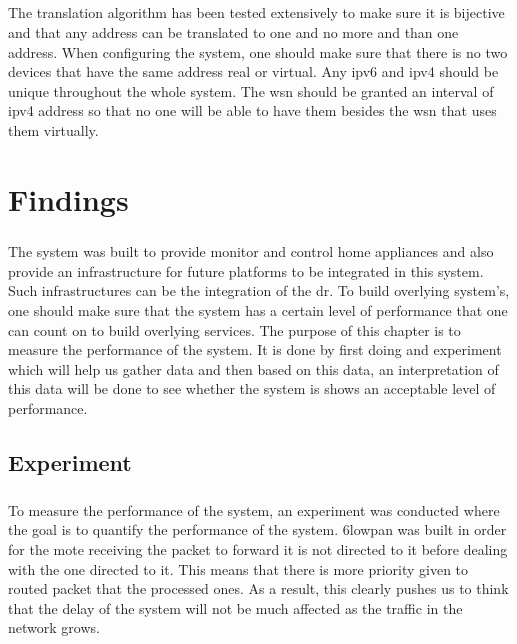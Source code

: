 \documentclass[oneside,12pt,a4paper,final]{book}
\begin{document}
\paragraph{}
The translation algorithm has been tested extensively to make sure it is bijective and that any address can be translated to one and no more and than one address. When configuring the system, one should make sure that there is no two devices that have the same address real or virtual. Any \gls{ipv6} and \gls{ipv4} should be unique throughout the whole system. The \gls{wsn} should be granted an interval of \gls{ipv4} address so that no one will be able to have them besides the \gls{wsn} that uses them virtually.


\chapter{Findings}
\paragraph{}
The system was built to provide monitor and control home appliances and also provide an infrastructure for future platforms to be integrated in this system. Such infrastructures can be the integration of the \gls{dr}. To build overlying system's, one should make sure that the system has a certain level of performance that one can count on to build overlying services. The purpose of this chapter is to measure the performance of the system. It is done by first doing and experiment which will help us gather data and then based on this data, an interpretation of this data will be done to see whether the system is shows an acceptable level of performance.
\section{Experiment}
\paragraph{}
To measure the performance of the system, an experiment was conducted where the goal is to quantify the performance of the system. \gls{6lowpan} was built in order for the mote receiving the packet to forward it is not directed to it before dealing with the one directed to it. This means that there is more priority given to routed packet that the processed ones. As a result, this clearly pushes us to think that the delay of the system will not be much affected as the traffic in the network grows.
\end{document}
